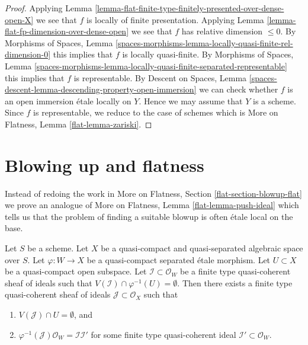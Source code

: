 \begin{proof}
Applying
Lemma \ref{lemma-flat-finite-type-finitely-presented-over-dense-open-X}
we see that $f$ is locally of finite presentation. Applying
Lemma \ref{lemma-flat-fp-dimension-over-dense-open}
we see that $f$ has relative dimension $\leq 0$.
By Morphisms of Spaces, Lemma
\ref{spaces-morphisms-lemma-locally-quasi-finite-rel-dimension-0}
this implies that $f$ is locally quasi-finite.
By Morphisms of Spaces, Lemma
\ref{spaces-morphisms-lemma-locally-quasi-finite-separated-representable}
this implies that $f$ is representable.
By Descent on Spaces, Lemma
\ref{spaces-descent-lemma-descending-property-open-immersion}
we can check whether $f$ is an open immersion \'etale locally on $Y$.
Hence we may assume that $Y$ is a scheme. Since $f$ is representable,
we reduce to the case of schemes which is
More on Flatness, Lemma \ref{flat-lemma-zariski}.
\end{proof}







\section{Blowing up and flatness}
\label{section-blowup-flat}

\noindent
Instead of redoing the work in
More on Flatness, Section \ref{flat-section-blowup-flat}
we prove an analogue of More on Flatness, Lemma \ref{flat-lemma-push-ideal}
which tells us that the problem of finding a suitable blowup
is often \'etale local on the base.

\begin{lemma}
\label{lemma-push-ideal}
Let $S$ be a scheme. Let $X$ be a quasi-compact and quasi-separated
algebraic space over $S$. Let $\varphi : W \to X$ be a quasi-compact
separated \'etale morphism. Let $U \subset X$ be a quasi-compact open
subspace. Let $\mathcal{I} \subset \mathcal{O}_W$ be a finite type
quasi-coherent sheaf of ideals such that
$V(\mathcal{I}) \cap \varphi^{-1}(U) = \emptyset$.
Then there exists a finite type quasi-coherent sheaf of ideals
$\mathcal{J} \subset \mathcal{O}_X$ such that
\begin{enumerate}
\item $V(\mathcal{J}) \cap U = \emptyset$, and
\item $\varphi^{-1}(\mathcal{J})\mathcal{O}_W = \mathcal{I} \mathcal{I}'$
for some finite type quasi-coherent ideal
$\mathcal{I}' \subset \mathcal{O}_W$.
\end{enumerate}
\end{lemma}

